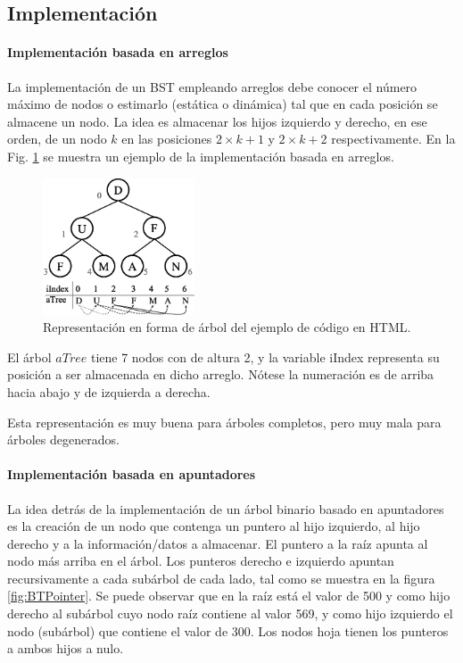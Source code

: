 \subsection{Implementación}

\paragraph{Implementación basada en arreglos}

La implementación de un BST empleando arreglos debe conocer el número máximo de nodos o estimarlo (estática o dinámica) tal que en cada posición se almacene un nodo. La idea es almacenar los hijos izquierdo y derecho, en ese orden, de un nodo $k$ en las posiciones $2 \times k + 1$ y $2 \times k + 2$ respectivamente. En la Fig. \ref{fig:vectorbinTree} se muestra un ejemplo de la implementación basada en arreglos.

\begin{figure}[htpb!]
  \begin{center}
    \includegraphics[width=0.4\textwidth]{images/vectorbinTree.eps}
  \end{center}
  \caption{Representación en forma de árbol del ejemplo de código en HTML.}
  \label{fig:vectorbinTree}
\end{figure}

El árbol $aTree$ tiene 7 nodos con de altura 2, y la variable iIndex representa su posición a ser almacenada en dicho arreglo. Nótese la numeración es de arriba hacia abajo y de izquierda a derecha.

Esta representación es muy buena para árboles completos, pero muy mala para árboles degenerados.

\paragraph{Implementación basada en apuntadores}

La idea detrás de la implementación de un árbol binario basado en apuntadores es la creación de un nodo que contenga un puntero al hijo izquierdo, al hijo derecho y a la información/datos a almacenar. El puntero a la raíz apunta al nodo más arriba en el árbol. Los punteros derecho e izquierdo apuntan recursivamente a cada subárbol de cada lado, tal como se muestra en la figura \ref{fig:BTPointer}. Se puede observar que en la raíz está el valor de 500 y como hijo derecho al subárbol cuyo nodo raíz contiene al valor 569, y como hijo izquierdo el nodo (subárbol) que contiene el valor de 300. Los nodos hoja tienen los punteros a ambos hijos a nulo.

